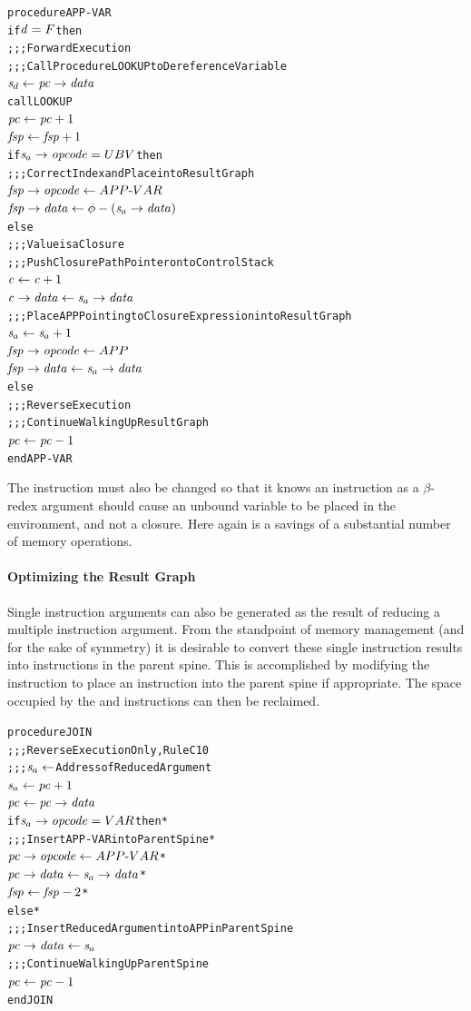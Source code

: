
\begin{alltt}
procedure APP-VAR
  if \(\rt{d} = F\) then
    ;;; Forward Execution
    ;;; Call Procedure LOOKUP to Dereference Variable
    \(\rtsd \leftarrow \rtfield{pc}{data}\)
    call LOOKUP
    \(\rt{pc} \leftarrow \rt{pc}+1\)
    \(\rt{fsp} \leftarrow \rt{fsp}+1\)
    if \(\rtsa\rightarrow\mathit{opcode} = UBV\) then
      ;;; Correct Index and Place into Result Graph
      \(\rtfield{fsp}{opcode} \leftarrow APP\textrm{-}VAR\)
      \(\rtfield{fsp}{data} \leftarrow \phi-(\rtsa\rightarrow\mathit{data})\)
    else
      ;;; Value is a Closure
      ;;; Push Closure Path Pointer onto Control Stack
      \(\rt{c} \leftarrow \rt{c}+1\)
      \(\rtfield{c}{data} \leftarrow \rtsa\rightarrow\mathit{data}\)
      ;;; Place APP Pointing to Closure Expression into Result Graph
      \(\rtsa \leftarrow \rtsa+1\)
      \(\rtfield{fsp}{opcode} \leftarrow APP\)
      \(\rtfield{fsp}{data} \leftarrow \rtsa\rightarrow\mathit{data}\)
  else
    ;;; Reverse Execution
    ;;; Continue Walking Up Result Graph
    \(\rt{pc} \leftarrow \rt{pc}-1\)
end APP-VAR
\end{alltt}

The  instruction must also be changed so that it knows an
 instruction as a \(\beta\)-redex argument should cause an unbound
variable to be placed in the environment, and not a closure. Here again is a
savings of a substantial number of memory operations.

\paragraph{Optimizing the Result Graph}

Single  instruction arguments can also be generated as the result of
reducing a multiple instruction argument. From the standpoint of memory management
(and for the sake of symmetry) it is desirable to convert these single 
instruction results into  instructions in the parent spine. This is
accomplished by modifying the  instruction to place an 
instruction into the parent spine if appropriate. The space occupied by the
 and  instructions can then be reclaimed.


\begin{alltt}
procedure JOIN
  ;;; Reverse Execution Only, Rule C10
  ;;; \(\rtsa \leftarrow\) Address of Reduced Argument
  \(\rtsa \leftarrow \rt{pc}+1\)
  \(\rt{pc} \leftarrow \rtfield{pc}{data}\)
  if \(\rtsa\rightarrow\mathit{opcode} = VAR\) then *
    ;;; Insert APP-VAR into Parent Spine *
    \(\rtfield{pc}{opcode} \leftarrow APP\textrm{-}VAR\) *
    \(\rtfield{pc}{data} \leftarrow \rtsa\rightarrow\mathit{data}\) *
    \(\rt{fsp} \leftarrow \rt{fsp}-2\) *
  else *
    ;;; Insert Reduced Argument into APP in Parent Spine
    \(\rtfield{pc}{data} \leftarrow \rtsa\)
  ;;; Continue Walking Up Parent Spine
  \(\rt{pc} \leftarrow \rt{pc}-1\)
end JOIN
\end{alltt}

